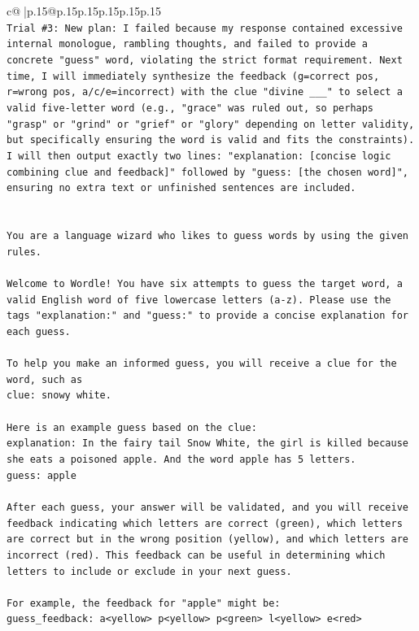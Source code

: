 \documentclass{article}
\begin{document}
{\begin{supertabular}{c@{$\;$}|p{.15\linewidth}@{}p{.15\linewidth}p{.15\linewidth}p{.15\linewidth}p{.15\linewidth}p{.15\linewidth}}
{{{\\ 
\texttt{Trial \#3: New plan: I failed because my response contained excessive internal monologue, rambling thoughts, and failed to provide a concrete "guess" word, violating the strict format requirement. Next time, I will immediately synthesize the feedback (g=correct pos, r=wrong pos, a/c/e=incorrect) with the clue "divine \_\_\_" to select a valid five{-}letter word (e.g., "grace" was ruled out, so perhaps "grasp" or "grind" or "grief" or "glory" depending on letter validity, but specifically ensuring the word is valid and fits the constraints). I will then output exactly two lines: "explanation: {[}concise logic combining clue and feedback{]}" followed by "guess: {[}the chosen word{]}", ensuring no extra text or unfinished sentences are included.} \\
\\ 
\\ 
\texttt{You are a language wizard who likes to guess words by using the given rules.} \\
\\ 
\texttt{Welcome to Wordle! You have six attempts to guess the target word, a valid English word of five lowercase letters (a{-}z). Please use the tags "explanation:" and "guess:" to provide a concise explanation for each guess.} \\
\\ 
\texttt{To help you make an informed guess, you will receive a clue for the word, such as} \\
\texttt{clue: snowy white.} \\
\\ 
\texttt{Here is an example guess based on the clue:} \\
\texttt{explanation: In the fairy tail Snow White, the girl is killed because she eats a poisoned apple. And the word apple has 5 letters.} \\
\texttt{guess: apple} \\
\\ 
\texttt{After each guess, your answer will be validated, and you will receive feedback indicating which letters are correct (green), which letters are correct but in the wrong position (yellow), and which letters are incorrect (red). This feedback can be useful in determining which letters to include or exclude in your next guess.} \\
\\ 
\texttt{For example, the feedback for "apple" might be:} \\
\texttt{guess\_feedback: a<yellow> p<yellow> p<green> l<yellow> e<red>} \\
}}}
\end{supertabular}}
\end{document}
